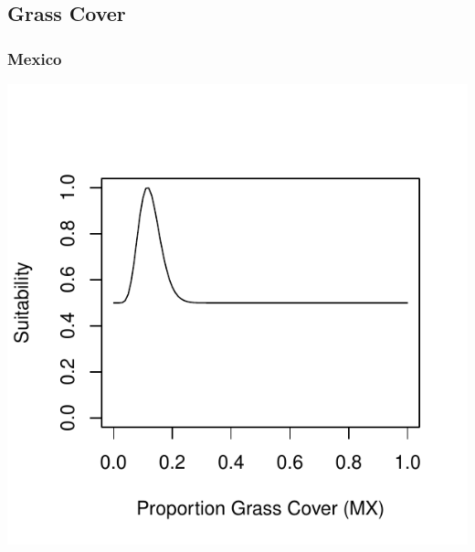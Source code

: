 \documentclass[12pt,letterpaper]{article}\usepackage{graphicx, color}
\makeatletter
\def\maxwidth{ %
  \ifdim\Gin@nat@width>\linewidth
    \linewidth
  \else
    \Gin@nat@width
  \fi
}
\newenvironment{knitrout}{}{} %
\makeatother
\begin{document}
\subsection{Grass Cover}
\subsubsection{Mexico}
\begin{knitrout}
\color{fgcolor}\includegraphics[width=\maxwidth]{figure/Goodwin_Grass_Cover_MX} 
\end{knitrout}
\end{document}

